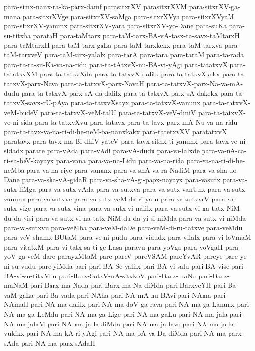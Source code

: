 {para-simx-nanx-ra-ka-parx-damf
parasitxrXV
parasitxrXVM
para-sitxrXV-ga-mana
para-sitxrXVge
para-sitxrXV-saMga
para-sitxrXVya
para-sitxrXVyaM
para-sitxrXV-yanunx
para-sitxrXV-yara
para-sitxrXV-yo-Dane
para-suKa
para-su-titxha
parataH
para-taMtarx
para-taM-tarx-BA-vA-tasx-ta-savx-taMtarxH
para-taMtarxH
para-taM-tarx-gaLa
para-taM-tarxkekx
para-taM-tarxva
para-taM-tarxveV
para-taM-tirx-yalalx
para-tarA
para-tara
para-taraM
para-ta-rada
para-ta-ra-su-Ka-va-na-ridu
para-ta-tAtxvX-nu-BA-vi-yAgi
para-tatatxvX
para-tatatxvXM
para-ta-tatxvXda
para-ta-tatxvX-dalilx
para-ta-tatxvXkekx
para-ta-tatxvX-parx-Nava
para-ta-tatxvX-parx-NavaH
para-ta-tatxvX-parx-Na-va-mA-dudu
para-ta-tatxvX-parx-sA-da-dalilx
para-ta-tatxvX-parx-sA-dakekx
para-ta-tatxvX-savx-rU-pAya
para-ta-tatxvXsayx
para-ta-tatxvX-vanunx
para-ta-tatxvX-veM-budeV
para-ta-tatxvX-veM-talU
para-ta-tatxvX-veV-diniV
para-ta-tatxvX-ve-ni-sida
para-ta-tatxvXvu
para-tatavx
para-ta-tavx-parx-mA-Nu-va-na-ridu
para-ta-tavx-va-na-ri-di-he-neM-ba-nanxkakx
para-tatetxvXV
paratatxvX
paratavx
para-tavx-ma-Bi-dhiV-yateV
para-tavx-sithx-ti-yanunx
para-tavx-ve-ni-sidadx
parate
para-vAda
para-vAdi
para-vA-dudu
para-va-lalxde
para-va-nA-ca-ri-sa-beV-kayayx
para-vana
para-va-na-Lidu
para-va-na-rida
para-va-na-ri-di-he-neMba
para-va-na-riye
para-vanunx
para-va-shA-va-ra-NadiM
para-va-sha-do-Dane
para-va-sha-vA-gidaR
para-va-sha-vA-gi-papx-nayayx
para-vasutx
para-va-sutx-liMga
para-va-sutx-vAda
para-va-sutxva
para-va-sutx-vanUnx
para-va-sutx-vanunx
para-va-sutxve
para-va-sutx-veM-da-ri-yaru
para-va-sutxveV
para-va-sutx-vige
para-va-sutx-vina
para-va-sutx-vi-nalilx
para-va-sutx-vi-na-tatx-NiM-du-da-yisi
para-va-sutx-vi-na-tatx-NiM-du-da-yi-si-niMda
para-va-sutx-vi-niMda
para-va-sutxvu
para-veMba
para-veM-daDe
para-veM-di-ru-tatxve
para-veMdu
para-veV-shamx-BUtaM
para-ve-ni-pudu
para-vidudx
para-vilalx
para-vi-loVmaM
para-vitatxM
para-vi-tatx-sa-ti-ge-Lasa
paravu
para-yoVga
para-yoVgaH
para-yoV-ga-veM-dare
parayxMtaM
pare
pareV
pareVSAM
pareYvAR
pareye
pare-ye-ni-su-vudu
pare-yiMda
pari
pari-BA-Se-yalilx
pari-BA-vi-salu
pari-BA-vise
pari-BA-vi-su-titxMtu
pari-Barx-SotxV-nA-sitxkoV
pari-Barx-maNa
pari-Barx-maNaM
pari-Barx-ma-Nada
pari-Barx-ma-Na-diMda
pari-BarxyeYH
pari-Ba-vaM-gaLa
pari-Ba-vada
pari-NAha
pari-NA-mA-nu-BAvi
pari-NAma
pari-NAmaH
pari-NA-ma-dalilx
pari-NA-ma-doV-ga-rava
pari-NA-ma-ga-Lanunx
pari-NA-ma-ga-LeMdu
pari-NA-ma-ga-Lige
pari-NA-ma-gaLu
pari-NA-ma-jala
pari-NA-ma-jalaM
pari-NA-ma-ja-la-diMda
pari-NA-ma-ja-lava
pari-NA-ma-ja-la-vukikx
pari-NA-ma-kA-ri-yAgi
pari-NA-ma-pA-va-Da-diMda
pari-NA-ma-parx-sAda
pari-NA-ma-parx-sAdaH
}
